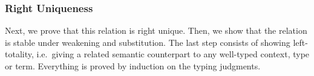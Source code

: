 
\subsubsection{Right Uniqueness}\label{sec:right_uniqueness}

Next, we prove that this relation is right unique.  Then, we show that the
relation is stable under weakening and substitution.  The last step consists of
showing left-totality, i.e.\ giving a related semantic counterpart to any
well-typed context, type or term.  Everything is proved by induction on the typing
judgments.

